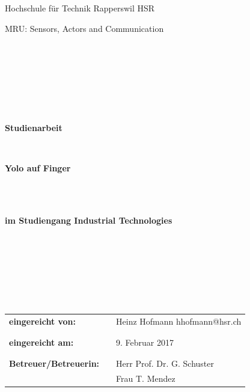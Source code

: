 \documentclass[a4paper,12pt]{article}
\begin{document}
\thispagestyle{empty}
\begin{center}
\Large{Hochschule für Technik Rapperswil HSR}\\
\end{center}

\begin{center}
\Large{MRU: Sensors, Actors and Communication}
\end{center}
\begin{verbatim}







\end{verbatim}
\begin{center}
\textbf{\LARGE{Studienarbeit}}
\end{center}
\begin{verbatim}


\end{verbatim}
\begin{center}
\textbf{\Huge{Yolo auf Finger}}
\end{center}
\begin{verbatim}



\end{verbatim}
\begin{center}
\textbf{im Studiengang Industrial Technologies}
\end{center}
\begin{verbatim}







\end{verbatim}

\begin{flushleft}
\begin{tabular}{lll}
\textbf{eingereicht von:} & & Heinz Hofmann \flq{}hhofmann@hsr.ch\frq{}\\
& & \\
& & \\
\textbf{eingereicht am:} & & 9. Februar 2017\\
& & \\
& & \\
\textbf{Betreuer/Betreuerin:} & & Herr Prof. Dr. G. Schuster \\
& & Frau T. Mendez
\end{tabular}
\end{flushleft}
\end{document}
